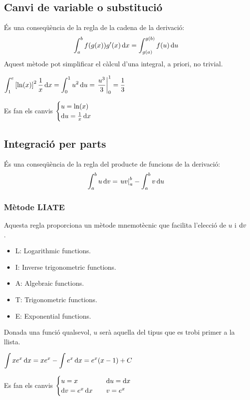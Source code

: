 \subsection{Canvi de variable o substitució}
És una conseqüència de la regla de la cadena de la derivació:
\begin{align}
    \int_{a}^{b} f(g(x)) g'(x) \mathop{}\!\mathrm{d} x = \int_{g(a)}^{g(b)} f(u) \mathop{}\!\mathrm{d} u
\end{align}
Aquest mètode pot simplificar el càlcul d'una integral, a priori, no trivial.
\begin{example}
    $\displaystyle \int_{1}^{e} \left[ \ln (x) \right]^{2} \frac{1}{x} \mathop{}\!\mathrm{d} x = \int_{0}^{1} u^{2} \mathop{}\!\mathrm{d} u = \left. \frac{u^{3}}{3}\right|_{0}^{1} = \frac{1}{3}$

    Es fan els canvis $\begin{cases} u = \ln (x) \\ \mathrm{d} u = \frac{1}{x} \mathop{}\!\mathrm{d} x \end{cases}$
\end{example}

\subsection{Integració per parts}
És una conseqüència de la regla del producte de funcions de la derivació:
\begin{align}
    \int_{a}^{b} u \mathop{}\!\mathrm{d} v = \left. uv \right|_{a}^{b} - \int_{a}^{b} v \mathop{}\!\mathrm{d} u
\end{align}

\subsubsection*{Mètode LIATE}
Aquesta regla proporciona un mètode mnemotècnic que facilita l'elecció de $u$ i $\mathrm{d} v$.
\begin{itemize}
    \item L: Logarithmic functions.
    \item I: Inverse trigonometric functions.
    \item A: Algebraic functions.
    \item T: Trigonometric functions.
    \item E: Exponential functions.
\end{itemize}
Donada una funció qualsevol, $u$ serà aquella del tipus que es trobi primer a la llista.
\begin{example}
    $\displaystyle \int x e^{x} \mathop{}\!\mathrm{d} x = x e^{x} - \int e^{x} \mathop{}\!\mathrm{d} x = e^{x} (x - 1) + C$

    Es fan els canvis $\begin{cases} u = x & \quad \mathrm{d} u = \mathrm{d} x\\ \mathrm{d} v = e^{x} \mathop{}\!\mathrm{d} x & \quad v = e^{x} \end{cases}$
\end{example}

